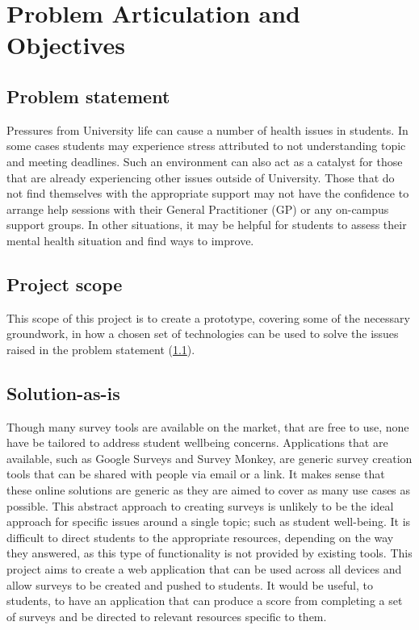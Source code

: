 \section{Problem Articulation and Objectives}

\subsection{Problem statement} \label{problemstatement}

Pressures from University life can cause a number of health issues in students.
In some cases students may experience stress attributed to not understanding topic and meeting deadlines.
Such an environment can also act as a catalyst for those that are already experiencing other issues outside of University.
Those that do not find themselves with the appropriate support may not have the confidence to arrange help sessions with their
General Practitioner (GP) or any on-campus support groups. 
In other situations, it may be helpful for students to assess their mental health situation and find ways to improve.

\subsection{Project scope}
This scope of this project is to create a prototype, covering some of the necessary groundwork, in how a chosen set of technologies can be used 
to solve the issues raised in the problem statement (\ref{problemstatement}).

\subsection{Solution-as-is}
Though many survey tools are available on the market, that are free to use, none have be tailored to address student wellbeing concerns.
Applications that are available, such as Google Surveys and Survey Monkey, are generic survey creation tools that can be shared with 
people via email or a link.
It makes sense that these online solutions are generic as they are aimed to cover as many use cases as possible.
This abstract approach to creating surveys is unlikely to be the ideal approach for specific issues around a single topic; such as
student well-being.
It is difficult to direct students to the appropriate resources, depending on the way they answered, as this type of functionality is not
provided by existing tools.
This project aims to create a web application that can be used across all devices and allow surveys to be created and pushed to students.
It would be useful, to students, to have an application that can produce a score from completing a set of surveys and be directed to relevant
resources specific to them.

